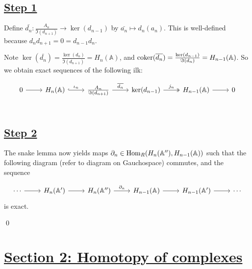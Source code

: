 \documentclass[x11names,reqno,14pt]{extarticle}
\newcommand{\A}{\mathbb{A}}
\begin{document}
\subsection*{\underline{Step 1}}

Define $\bar{d_n}:\frac{A_n}{\Im(d_{n + 1})} \to \ker(d_{n - 1})$ by $\bar{a_n} \mapsto d_n(a_n)$. This is well-defined because $d_nd_{n + 1} = 0 = d_{n - 1}d_n$.

Note $\ker(\bar{d_n}) = \frac{\ker(d_n)}{\Im(d_{n + 1})} = H_n(\A)$, and $\coker(\bar{d_n}) = \frac{\ker(d_{n - 1})}{\Im(d_n)} = H_{n - 1}(\A)$. So we obtain exact sequences of the following ilk:

\[
\begin{tikzcd}
0\ar[r]& H_n(\A) \ar[r, hook, "\iota_n"] & \frac{A_n}{\Im(d_{n + 1})} \ar[r, "\bar{d_n}"] & \ker(d_{n -1 }) \ar[r, twoheadrightarrow, "j_n"] & H_{n - 1}(\A) \ar[r] & 0 \\
\end{tikzcd}
\]

\subsection*{\underline{Step 2}}

The snake lemma now yields maps $\del_n\in\Hom_R(H_n(\A''), H_{n - 1}(\A))$ such that the following diagram (refer to diagram on Gauchospace) commutes, and the sequence 

\[
\begin{tikzcd}
\cdots\ar[r]& H_n(\A') \ar[r] & H_n(\A'') \ar[r, "\del_n"] & H_{n - 1}(\A) \ar[r] & H_{n - 1}(\A') \ar[r] & \cdots
\end{tikzcd}
\]
is exact.

\qed

\section*{\underline{Section 2: Homotopy of complexes}}

\,
\end{document}
